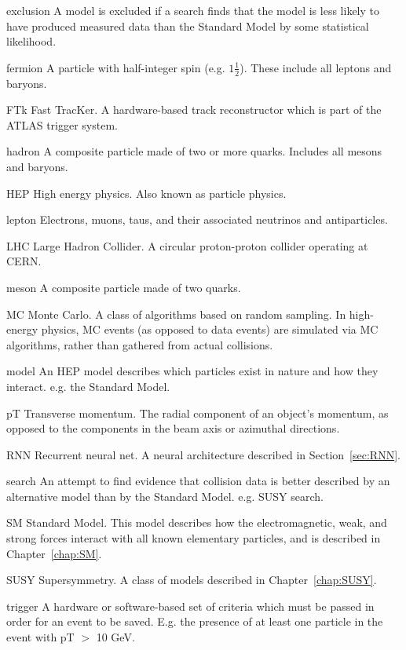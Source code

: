 \begin{symbollist*}
\item[exclusion] A model is excluded if a search finds that the model is less likely to have produced measured data than the Standard Model by some statistical likelihood.
\item[fermion] A particle with half-integer spin (e.g. $1\frac{1}{2}$). These include all leptons and baryons.
\item[FTk] Fast TracKer. A hardware-based track reconstructor which is part of the ATLAS trigger system.
\item[hadron] A composite particle made of two or more quarks. Includes all mesons and baryons.
\item[HEP] High energy physics. Also known as particle physics.
\item[lepton] Electrons, muons, taus, and their associated neutrinos and antiparticles.
\item[LHC] Large Hadron Collider. A circular proton-proton collider operating at CERN.
\item[meson] A composite particle made of two quarks.
\item[MC] Monte Carlo. A class of algorithms based on random sampling. In high-energy physics, MC events (as opposed to data events) are simulated via MC algorithms, rather than gathered from actual collisions.
\item[model] An HEP model describes which particles exist in nature and how they interact. e.g. the Standard Model.
\item[pT] Transverse momentum. The radial component of an object's momentum, as opposed to the components in the beam axis or azimuthal directions.
\item[RNN] Recurrent neural net. A neural architecture described in Section~\ref{sec:RNN}.
\item[search] An attempt to find evidence that collision data is better described by an alternative model than by the Standard Model. e.g. SUSY search.
\item[SM] Standard Model. This model describes how the electromagnetic, weak, and strong forces interact with all known elementary particles, and is described in Chapter~\ref{chap:SM}.
\item[SUSY] Supersymmetry. A class of models described in Chapter~\ref{chap:SUSY}.
\item[trigger] A hardware or software-based set of criteria which must be passed in order for an event to be saved. E.g. the presence of at least one particle in the event with pT $>$ 10 GeV.
\end{symbollist*}

\item[cross section]
\item[ET]
\item[FPGA]
\item[hard scatter]
\item[jet]
\item[MET]
\item[parton]
\item[pileup] \cite{pileup}